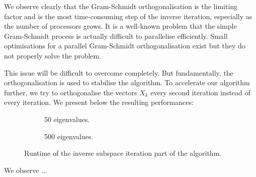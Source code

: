 We observe clearly that the Gram-Schmidt orthogonalisation is the limiting factor and is the most time-consuming step of the inverse iteration, especially as the number of processors grows.
It is a well-known problem that the simple Gram-Schmidt process is actually difficult to parallelise efficiently.
Small optimisations for a parallel Gram-Schmidt orthogonalisation exist \cite{katagiri_parallel_gram_schmidt_2003} but they do not properly solve the problem.

This issue will be difficult to overcome completely.
But fundamentally, the orthogonalisation is used to stabilise the algorithm.
To accelerate our algorithm further, we try to orthogonalise the vectors \(X_k\) every second iteration instead of every iteration.
We present below the resulting performances:

\begin{figure}[H]
  \centering
  \begin{subfigure}[b]{0.5\textwidth}
   
   \caption{50 eigenvalues.}
  \end{subfigure}
  \begin{subfigure}[b]{0.45\textwidth}
   
   \caption{500 eigenvalues.}
  \end{subfigure}
  \caption{Runtime of the inverse subspace iteration part of the algorithm.}
\end{figure}

We observe ...

